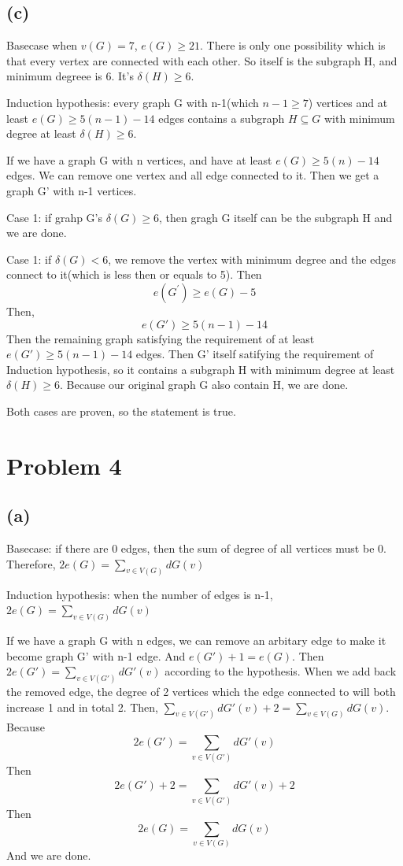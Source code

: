 \documentclass[11pt]{article}
\begin{document}
\subsection*{(c)}
Basecase when $v(G)=7$, $ e\left(G\right)\ge21 $. There is only one possibility which is that every vertex are connected with each other. So itself is the subgraph H, and minimum degreee is 6. It's $ \delta(H)\ge6 $.

Induction hypothesis: every graph G with n-1(which $ n-1\ge7 $) vertices and at least $ e(G)\ge5\left(n-1\right)-14 $ edges contains a subgraph $ H\subseteq G $ with minimum degree at least $ \delta(H)\ge6 $.

If we have a graph G with n vertices, and have at least $ e(G)\ge5\left(n\right)-14 $ edges. We can remove one vertex and all edge connected to it. Then we get a graph G' with n-1 vertices.

Case 1: if grahp G's $ \delta(G)\ge6$, then gragh G itself can be the subgraph H and we are done. 

Case 1: if $ \delta(G)<6 $, we remove the vertex with minimum degree and the edges connect to it(which is less then or equals to 5). Then$$ e\left(G^{\prime}\right)\ge e\left(G\right)-5 $$
Then,
$$ e(G')\ge5\left(n-1\right)-14 $$
Then the remaining graph satisfying the requirement of at least $ e(G')\ge5\left(n-1\right)-14 $ edges. Then G' itself satifying the requirement of Induction hypothesis, so it contains a subgraph H with minimum degree at least $ \delta(H)\ge6 $. Because our original graph G also contain H, we are done.

Both cases are proven, so the statement is true.

\section*{Problem 4}
\subsection*{(a)}

Basecase: if there are 0 edges, then the sum of degree of all vertices must be 0. Therefore, $ 2e(G)=\sum_{v\in V(G)}dG(v) $

Induction hypothesis: when the number of edges is n-1, $2e(G)=\sum_{v\in V(G)}dG(v)$

If we have a graph G with n edges, we can remove an arbitary edge to make it become graph G' with n-1 edge. And $e(G')+1=e(G)$. Then $2e(G')=\sum_{v\in V(G')}dG'(v)$ according to the hypothesis. When we add back the removed edge, the degree of 2 vertices which the edge connected to will both increase 1 and in total 2. Then, $\sum_{v\in V(G')}dG'(v)+2=\sum_{v\in V(G)}dG(v)$.\\
Because
$$2e(G')=\sum_{v\in V(G')}dG'(v)$$
Then
$$2e(G')+2=\sum_{v\in V(G')}dG'(v)+2$$
Then 
$$2e(G)=\sum_{v\in V(G)}dG(v)$$
And we are done.
\end{document}
